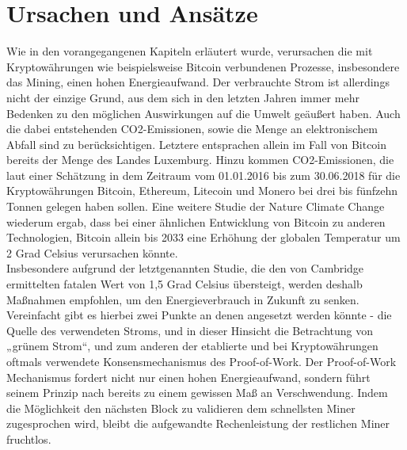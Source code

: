 \documentclass[12pt]{article}
\begin{document}
\section{Ursachen und Ansätze}
Wie in den vorangegangenen Kapiteln erläutert wurde, verursachen die mit Kryptowährungen wie beispielsweise Bitcoin verbundenen Prozesse, insbesondere das Mining, einen hohen Energieaufwand. Der verbrauchte Strom ist allerdings nicht der einzige Grund, aus dem sich in den letzten Jahren immer mehr Bedenken zu den möglichen Auswirkungen auf die Umwelt geäußert haben. Auch die dabei entstehenden CO2-Emissionen, sowie die Menge an elektronischem Abfall sind zu berücksichtigen. Letztere entsprachen allein im Fall von Bitcoin bereits der Menge des Landes Luxemburg. Hinzu kommen CO2-Emissionen, die laut einer Schätzung in dem Zeitraum vom 01.01.2016 bis zum 30.06.2018 für die Kryptowährungen Bitcoin, Ethereum, Litecoin und Monero bei drei bis fünfzehn Tonnen gelegen haben sollen. Eine weitere Studie der Nature Climate Change wiederum ergab, dass bei einer ähnlichen Entwicklung von Bitcoin zu anderen Technologien, Bitcoin allein bis 2033 eine Erhöhung der globalen Temperatur um 2 Grad Celsius verursachen könnte.\\
Insbesondere aufgrund der letztgenannten Studie, die den von Cambridge ermittelten fatalen Wert von 1,5 Grad Celsius übersteigt, werden deshalb Maßnahmen empfohlen, um den Energieverbrauch in Zukunft zu senken. Vereinfacht gibt es hierbei zwei Punkte an denen angesetzt werden könnte - die Quelle des verwendeten Stroms, und in dieser Hinsicht die Betrachtung von „grünem Strom“, und zum anderen der etablierte und bei Kryptowährungen oftmals verwendete Konsensmechanismus des Proof-of-Work. Der Proof-of-Work Mechanismus fordert nicht nur einen hohen Energieaufwand, sondern führt seinem Prinzip nach bereits zu einem gewissen Maß an Verschwendung. Indem die Möglichkeit den nächsten Block zu validieren dem schnellsten Miner zugesprochen wird, bleibt die aufgewandte Rechenleistung der restlichen Miner fruchtlos.
\end{document}
